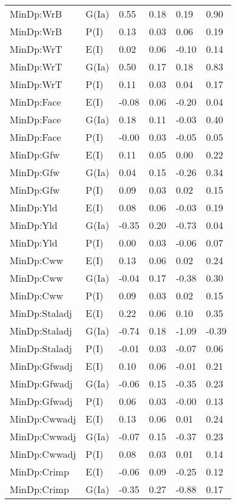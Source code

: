 \begin{center}
\begin{longtable}{|p{1.1in}|p{0.7in}|p{0.7in}|p{0.6in}|p{0.6in}|p{0.6in}|}
  MinDp:WrB & G(Ia) & 0.55 & 0.18 & 0.19 & 0.90 \\ 
  MinDp:WrB & P(I) & 0.13 & 0.03 & 0.06 & 0.19 \\ 
  MinDp:WrT & E(I) & 0.02 & 0.06 & -0.10 & 0.14 \\ 
  MinDp:WrT & G(Ia) & 0.50 & 0.17 & 0.18 & 0.83 \\ 
  MinDp:WrT & P(I) & 0.11 & 0.03 & 0.04 & 0.17 \\ 
  MinDp:Face & E(I) & -0.08 & 0.06 & -0.20 & 0.04 \\ 
  MinDp:Face & G(Ia) & 0.18 & 0.11 & -0.03 & 0.40 \\ 
  MinDp:Face & P(I) & -0.00 & 0.03 & -0.05 & 0.05 \\ 
  MinDp:Gfw & E(I) & 0.11 & 0.05 & 0.00 & 0.22 \\ 
  MinDp:Gfw & G(Ia) & 0.04 & 0.15 & -0.26 & 0.34 \\ 
  MinDp:Gfw & P(I) & 0.09 & 0.03 & 0.02 & 0.15 \\ 
  MinDp:Yld & E(I) & 0.08 & 0.06 & -0.03 & 0.19 \\ 
  MinDp:Yld & G(Ia) & -0.35 & 0.20 & -0.73 & 0.04 \\ 
  MinDp:Yld & P(I) & 0.00 & 0.03 & -0.06 & 0.07 \\ 
  MinDp:Cww & E(I) & 0.13 & 0.06 & 0.02 & 0.24 \\ 
  MinDp:Cww & G(Ia) & -0.04 & 0.17 & -0.38 & 0.30 \\ 
  MinDp:Cww & P(I) & 0.09 & 0.03 & 0.02 & 0.15 \\ 
  MinDp:Staladj & E(I) & 0.22 & 0.06 & 0.10 & 0.35 \\ 
  MinDp:Staladj & G(Ia) & -0.74 & 0.18 & -1.09 & -0.39 \\ 
  MinDp:Staladj & P(I) & -0.01 & 0.03 & -0.07 & 0.06 \\ 
  MinDp:Gfwadj & E(I) & 0.10 & 0.06 & -0.01 & 0.21 \\ 
  MinDp:Gfwadj & G(Ia) & -0.06 & 0.15 & -0.35 & 0.23 \\ 
  MinDp:Gfwadj & P(I) & 0.06 & 0.03 & -0.00 & 0.13 \\ 
  MinDp:Cwwadj & E(I) & 0.13 & 0.06 & 0.01 & 0.24 \\ 
  MinDp:Cwwadj & G(Ia) & -0.07 & 0.15 & -0.37 & 0.23 \\ 
  MinDp:Cwwadj & P(I) & 0.08 & 0.03 & 0.01 & 0.14 \\ 
  MinDp:Crimp & E(I) & -0.06 & 0.09 & -0.25 & 0.12 \\ 
  MinDp:Crimp & G(Ia) & -0.35 & 0.27 & -0.88 & 0.17 \\ 

\end{longtable}
\end{center}
